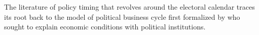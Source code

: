 \documentclass{article}
\begin{document}
		
		The literature of policy timing
		that revolves
		around
		the electoral calendar
		traces its root back to
		the model of political business cycle
		first formalized by
		\citeauthor{nordhausPoliticalBusinessCycle1975}
		\autocite*{nordhausPoliticalBusinessCycle1975}
		who
		sought to explain economic conditions
		with political institutions.
%			
\end{document}
